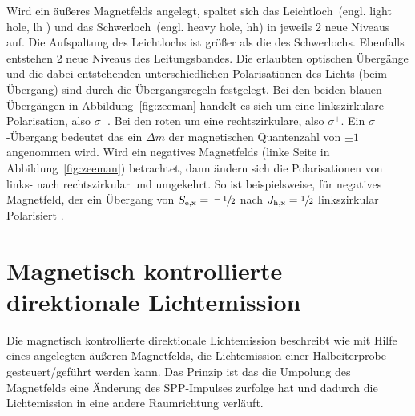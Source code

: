 Wird ein äußeres Magnetfelds angelegt, spaltet sich das Leichtloch~(engl. light hole, lh ) 
und das Schwerloch~(engl. heavy hole, hh) in jeweils 2 neue Niveaus auf.
Die Aufspaltung des Leichtlochs ist größer als die des Schwerlochs.
Ebenfalls entstehen 2 neue Niveaus des Leitungsbandes.
Die erlaubten optischen Übergänge und die dabei entstehenden unterschiedlichen 
Polarisationen des Lichts (beim Übergang) sind durch die Übergangsregeln festgelegt.
Bei den beiden blauen Übergängen in Abbildung~\ref{fig:zeeman} handelt
es sich um eine linkszirkulare Polarisation, also $\sigma^-$.
Bei den roten um eine rechtszirkulare, also  $\sigma^+$. 
Ein $\sigma$-Übergang bedeutet das ein $\Delta m$ der magnetischen Quantenzahl von 
$\pm 1$ angenommen wird.
Wird ein negatives Magnetfelds (linke Seite in Abbildung~\ref{fig:zeeman}) betrachtet,
dann ändern sich die Polarisationen von links- nach rechtszirkular und umgekehrt.
So ist beispielsweise, für negatives Magnetfeld, der ein Übergang von $S_\text{e,x} = \sfrac{-1}{2}$
nach $J_\text{h,x} = \sfrac{1}{2}$ linkszirkular Polarisiert .

\section{Magnetisch kontrollierte direktionale Lichtemission}

Die magnetisch kontrollierte direktionale Lichtemission
beschreibt wie mit Hilfe eines angelegten äußeren Magnetfelds, die Lichtemission
einer Halbeiterprobe gesteuert/geführt werden kann.
Das Prinzip ist das die Umpolung des Magnetfelds eine Änderung des SPP-Impulses zurfolge hat 
und dadurch die Lichtemission in eine andere Raumrichtung verläuft.

